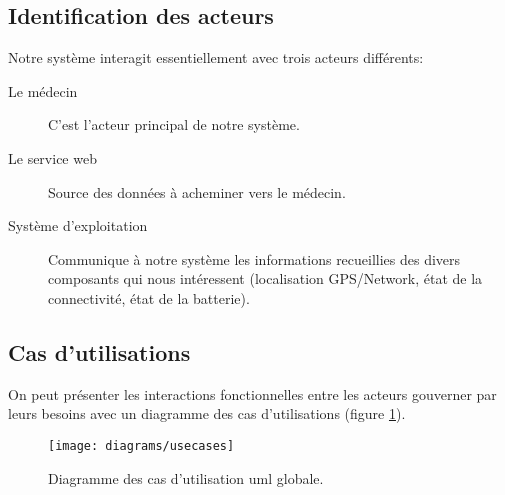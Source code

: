 \subsection{Identification des acteurs}

Notre système interagit essentiellement avec trois acteurs différents:

\begin{description}

\item[Le médecin] C'est l'acteur principal de notre système.

\item[Le service web] Source des données à acheminer vers le médecin.

\item[Système d'exploitation] Communique à notre système les
informations recueillies des divers composants qui nous intéressent
(localisation GPS/Network, état de la connectivité, état de la
batterie).

\end{description}

\subsection{Cas d'utilisations}

On peut présenter les interactions fonctionnelles entre les acteurs gouverner par leurs besoins avec un diagramme des cas d'utilisations (figure \ref{fig:uml_usecase}).

\begin{figure}
\center
\texttt{[image: diagrams/usecases]}
\caption{Diagramme des cas d'utilisation \gls{uml} globale.}
\label{fig:uml_usecase}
\end{figure}

